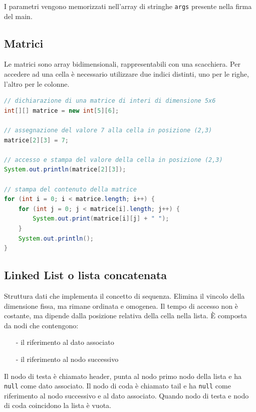 \documentclass[a4paper]{article}
\begin{document}
I parametri vengono memorizzati nell'array di stringhe \verb|args| presente nella firma del main.

\subsection{Matrici}
Le matrici sono array bidimensionali, rappresentabili con una scacchiera. Per accedere ad una cella è necessario utilizzare due
indici distinti, uno per le righe, l'altro per le colonne.

\begin{lstlisting}[language=Java]
// dichiarazione di una matrice di interi di dimensione 5x6
int[][] matrice = new int[5][6];

// assegnazione del valore 7 alla cella in posizione (2,3)
matrice[2][3] = 7;

// accesso e stampa del valore della cella in posizione (2,3)
System.out.println(matrice[2][3]);

// stampa del contenuto della matrice
for (int i = 0; i < matrice.length; i++) {
	for (int j = 0; j < matrice[i].length; j++) {
		System.out.print(matrice[i][j] + " ");
	}
	System.out.println();
}
\end{lstlisting}

\newpage

\subsection{Linked List o lista concatenata}
Struttura dati che implementa il concetto di sequenza. Elimina il vincolo della dimensione fissa, ma rimane ordinata e omogenea.
Il tempo di accesso non è costante, ma dipende dalla posizione relativa della cella nella lista. È composta da nodi che contengono:
\begin{itemize} [topsep=3pt, itemsep=0pt]
	\item[-] il riferimento al dato associato
	\item[-] il riferimento al nodo successivo
\end{itemize}

Il nodo di testa è chiamato header, punta al nodo primo nodo della lista e ha \verb|null| come dato associato. Il nodo di coda è
chiamato tail e ha \verb|null| come riferimento al nodo successivo e al dato associato. Quando nodo di testa e nodo di coda coincidono
la lista è vuota.
\end{document}
